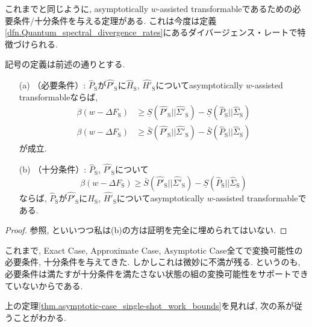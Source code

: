 これまでと同じように, asymptotically $w$-assisted transformableであるための必要条件/十分条件を与える定理がある. 
これは今度は定義\ref{dfn.Quantum_spectral_divergence_rates}にあるダイバージェンス・レートで特徴づけられる. 

\begin{mythm}\label{thm.asymptotic-case_single-shot_work_bounds}
  記号の定義は前述の通りとする. 
  \begin{enumerate}
    \item[(a)]（必要条件）: $\widehat{P}_{\text{S}}$が$\widehat{P'}_{\text{S}}$に$\widehat{H}_{\text{S}}$, $\widehat{H'}_{\text{S}}$についてasymptotically $w$-assisted transformableならば, 
    \begin{align}
      \beta(w-\Delta F_{\text{S}})&\geq \underline{S}(\widehat{P'}_{\text{S}}||\widehat{\Sigma '}_{\text{S}})-\underline{S}(\widehat{P}_{\text{S}}||\widehat{\Sigma}_{\text{S}})\\
      \beta(w-\Delta F_{\text{S}})&\geq \bar{S}(\widehat{P'}_{\text{S}}||\widehat{\Sigma '}_{\text{S}})-\bar{S}(\widehat{P}_{\text{S}}||\widehat{\Sigma}_{\text{S}})
    \end{align}
    が成立. 
    \item[(b)]（十分条件）: $\widehat{P}_{\text{S}}$, $\widehat{P'}_{\text{S}}$について
    \begin{equation}
      \beta(w-\Delta F_{\text{S}})\geq \bar{S}(\widehat{P'}_{\text{S}}||\widehat{\Sigma '}_{\text{S}}) - \underline{S}(\widehat{P}_{\text{S}}||\widehat{\Sigma}_{\text{S}})
    \end{equation}
    ならば, $\widehat{P}_{\text{S}}$が$\widehat{P'}_{\text{S}}$に$\widehat{H}_{\text{S}}$, $\widehat{H'}_{\text{S}}$についてasymptotically $w$-assisted transformableである. 
  \end{enumerate}
\end{mythm}

\begin{proof}
  \cite{SagawaEntropy}参照, といいつつ私は(b)の方は証明を完全に埋められてはいない. 
\end{proof}

これまで, Exact Case, Approximate Case, Asymptotic Case全てで変換可能性の必要条件, 十分条件を与えてきた. 
しかしこれは微妙に不満が残る. 
というのも, 必要条件は満たすが十分条件を満たさない状態の組の変換可能性をサポートできていないからである. 

上の定理\ref{thm.asymptotic-case_single-shot_work_bounds}を見れば, 次の系が従うことがわかる. 

